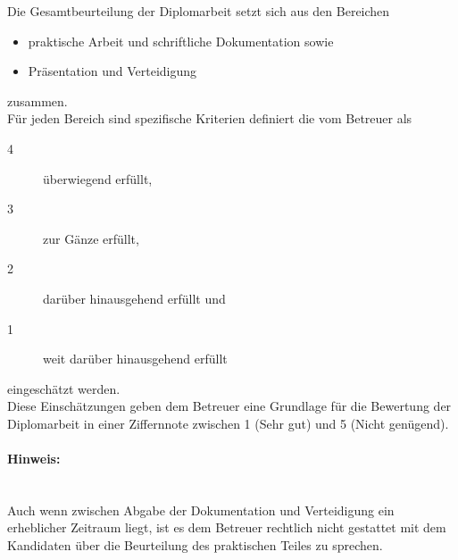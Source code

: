 \renewcommand*{\authorOfNextLines}{Helmut Quinz}
Die Gesamtbeurteilung der Diplomarbeit setzt sich aus den Bereichen
\begin{itemize}
	\item praktische Arbeit und schriftliche Dokumentation sowie
	\item Präsentation und Verteidigung
\end{itemize}
zusammen.\\
Für jeden Bereich sind spezifische Kriterien definiert die vom Betreuer als
\begin{description}
	\item[4] überwiegend erfüllt,
	\item[3] zur Gänze erfüllt,
	\item[2] darüber hinausgehend erfüllt und
	\item[1] weit darüber hinausgehend erfüllt 
\end{description}
eingeschätzt werden.\\
Diese Einschätzungen geben dem Betreuer eine Grundlage für die Bewertung der Diplomarbeit in einer Ziffernnote zwischen 1 (Sehr gut) und 5 (Nicht genügend).
\paragraph{Hinweis:}~\\
Auch wenn zwischen Abgabe der Dokumentation und Verteidigung ein erheblicher Zeitraum liegt, 
ist es dem Betreuer rechtlich nicht gestattet mit dem Kandidaten über die Beurteilung des praktischen Teiles zu sprechen.